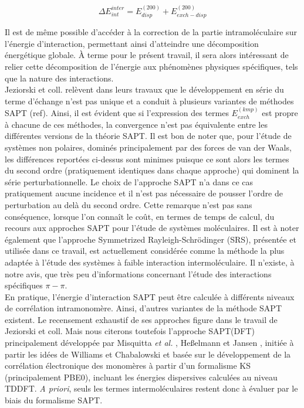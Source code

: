 \documentclass[12pt,a4paper]{book}
\begin{document}
	\begin{equation}
	\Delta E_{int}^{inter} =  E_{disp}^{(200)} + E_{exch-disp}^{(200)}
	\end{equation}
	
	Il est de même possible d’accéder à la correction de la partie intramoléculaire sur l’énergie d’interaction, permettant ainsi d’atteindre une décomposition énergétique globale. À terme pour le présent travail, il sera alors intéressant de relier cette décomposition de l'énergie aux phénomènes physiques spécifiques, tels que la nature des interactions. \\
	
	Jeziorski et coll. relèvent dans leurs travaux que le développement en série du terme d’échange n’est pas unique et a conduit à plusieurs variantes de méthodes SAPT (ref). Ainsi, il est évident que si l’expression des termes $E_{exch}^{(kmp)}$ est propre à chacune de ces méthodes, la convergence n'est pas équivalente entre les différentes versions de la théorie SAPT. Il est bon de noter que, pour l’étude de systèmes non polaires, dominés principalement par des forces de van der Waals, les différences reportées ci-dessus sont minimes puisque ce sont alors les termes du second ordre (pratiquement identiques dans chaque approche) qui dominent la série perturbationnelle. Le choix de l’approche SAPT n’a dans ce cas pratiquement aucune incidence et il n’est pas nécessaire de pousser l’ordre de perturbation au delà du second ordre. Cette remarque n’est pas sans conséquence, lorsque l’on connaît le coût, en termes de temps de calcul, du recours aux approches SAPT pour l’étude de systèmes moléculaires. Il est à noter également que l’approche Symmetrized Rayleigh-Schr\"{o}dinger (SRS), présentée et utilisée dans ce travail, est actuellement considérée comme la méthode la plus adaptée à l’étude des systèmes à faible interaction intermoléculaire. Il n’existe, à notre avis, que très peu d’informations concernant l’étude des interactions spécifiques $\pi-\pi$.\\
	
	
	En pratique, l’énergie d'interaction SAPT peut être calculée à différents niveaux de corrélation intramonomère. Ainsi, d’autres variantes de la méthode SAPT existent.
	Le recensement exhaustif de ses approches figure dans le travail de Jeziorski et coll. Mais nous citerons toutefois l’approche SAPT(DFT) principalement développée par 
	Misquitta \textit{et al.} \cite{misquitta2005intermolecular}, Heßelmann et Jansen \cite{hesselmann2002first}, initiée à partir les idées de Williams et Chabalowski \cite{williams2001using} et basée sur le développement de la corrélation électronique des monomères à partir d’un formalisme KS (principalement PBE0), incluant les énergies dispersives calculées au niveau TDDFT. \textit{A priori}, seuls les termes intermoléculaires restent donc à évaluer par le biais du formalisme SAPT.\\
	
\end{document}
